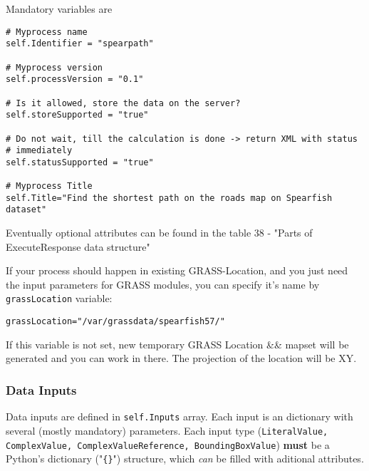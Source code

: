 \documentclass[a4paper,11pt]{article}
\begin{document}
     
    Mandatory variables are
     

    \begin{verbatim}
# Myprocess name
self.Identifier = "spearpath"

# Myprocess version
self.processVersion = "0.1"

# Is it allowed, store the data on the server?
self.storeSupported = "true"

# Do not wait, till the calculation is done -> return XML with status
# immediately
self.statusSupported = "true"

# Myprocess Title
self.Title="Find the shortest path on the roads map on Spearfish dataset"
    \end{verbatim}

     
    Eventually optional attributes can be found in the table 38 - "Parts of
    ExecuteResponse data structure"
     

     
    If your process should happen in existing GRASS-Location, and you just need
    the input parameters for GRASS modules, you can specify it's name by
    \texttt{grassLocation} variable:
     

    \begin{verbatim}
grassLocation="/var/grassdata/spearfish57/"
    \end{verbatim}

     
If this variable is not set, new temporary GRASS Location \&\& mapset will be
generated and you can work in there. The projection of the location will be
XY.
     


    \subsubsection{Data Inputs}
     
    Data inputs are defined in \texttt{self.Inputs} array. Each input is an dictionary with
    several (mostly mandatory) parameters. Each input type
    (\texttt{LiteralValue, ComplexValue, ComplexValueReference,
    BoundingBoxValue}) \textbf{must} be a Python's dictionary
    ("\texttt{\{\}}") structure, which \emph{can} be filled with aditional
    attributes.
\end{document}
